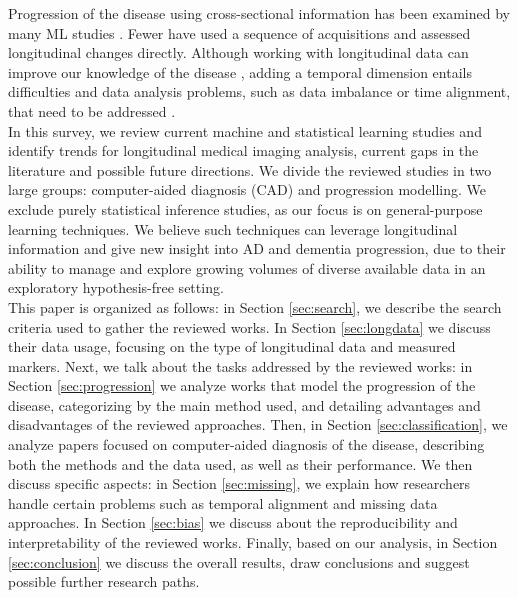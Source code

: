 Progression of the disease using cross-sectional information has been examined by many ML studies \cite{Oxtoby2017,Acharya2019}. Fewer have used a sequence of acquisitions and assessed longitudinal changes directly. Although working with longitudinal data can improve our knowledge of the disease \cite{Xu2014}, adding a temporal dimension entails difficulties and data analysis problems, such as data imbalance or time alignment, that need to be addressed \cite{Fitzmaurice2008,Ibrahim}. \\

In this survey, we review current machine and statistical learning studies and identify trends for longitudinal medical imaging analysis, current gaps in the literature and possible future directions. We divide the reviewed studies in two large groups: computer-aided diagnosis (CAD) and progression modelling. We exclude purely statistical inference studies, as our focus is on general-purpose learning techniques. We believe such techniques can leverage longitudinal information and give new insight into AD and dementia progression, due to their ability to manage and explore growing volumes of diverse available data in an exploratory hypothesis-free setting.\\


This paper is organized as follows: in Section \ref{sec:search}, we describe the search criteria used to gather the reviewed works. In Section \ref{sec:longdata} we discuss their data usage, focusing on the type of longitudinal data and measured markers. Next, we talk about the tasks addressed by the reviewed works: in Section \ref{sec:progression} we analyze works that model the progression of the disease, categorizing by the main method used, and detailing advantages and disadvantages of the reviewed approaches. Then, in Section \ref{sec:classification}, we analyze papers focused on computer-aided diagnosis of the disease, describing both the methods and the data used, as well as their performance. We then discuss specific aspects: in Section \ref{sec:missing}, we explain how researchers handle certain problems such as temporal alignment and missing data approaches. In Section \ref{sec:bias} we discuss about the reproducibility and interpretability of the reviewed works. Finally, based on our analysis, in Section \ref{sec:conclusion} we discuss the overall results, draw conclusions and suggest possible further research paths. \\

